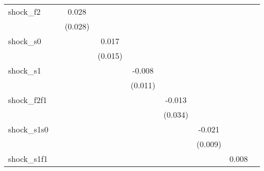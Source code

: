 {\begin{tabular}{l*{8}{c}}
\addlinespace
shock\_f2    &                     &       0.028         &                     &                     &                     &                     &                     &                     \\
            &                     &     (0.028)         &                     &                     &                     &                     &                     &                     \\
\addlinespace
shock\_s0    &                     &                     &       0.017         &                     &                     &                     &                     &                     \\
            &                     &                     &     (0.015)         &                     &                     &                     &                     &                     \\
\addlinespace
shock\_s1    &                     &                     &                     &      -0.008         &                     &                     &                     &                     \\
            &                     &                     &                     &     (0.011)         &                     &                     &                     &                     \\
\addlinespace
shock\_f2f1  &                     &                     &                     &                     &      -0.013         &                     &                     &                     \\
            &                     &                     &                     &                     &     (0.034)         &                     &                     &                     \\
\addlinespace
shock\_s1s0  &                     &                     &                     &                     &                     &      -0.021\sym{**} &                     &                     \\
            &                     &                     &                     &                     &                     &     (0.009)         &                     &                     \\
\addlinespace
shock\_s1f1  &                     &                     &                     &                     &                     &                     &       0.008         &                     \\

\end{tabular}}
